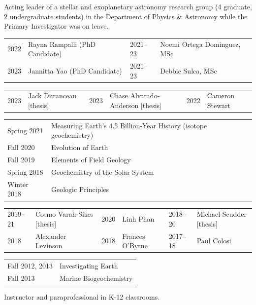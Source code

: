 Acting leader of a stellar and exoplanetary astronomy research group (4 graduate, 2 undergraduate students) in the Department of Physics \& Astronomy while the Primary Investigator was on leave.

\begin{tabular}{ll|ll}
	2022\ongoing & Rayna Rampalli (PhD Candidate) 
	&
	2021--23 & Noemi Ortega Dominguez, MSc
	\\
	2023\ongoing & Jannitta Yao (PhD Candidate)
	&
	2021--23 & Debbie Sulca, MSc
\end{tabular}
\begin{tabular}{ll | ll |ll}
	2023 & Jack Duranceau [thesis] & 
	2023 & Chase Alvarado-Anderson [thesis] &
	2022 & Cameron Stewart
\end{tabular}

\begin{tabular}{ll}
	Spring 2021 & Measuring Earth’s 4.5 Billion-Year History \normalfont(isotope geochemistry)\\
	Fall 2020 & Evolution of Earth\\
	Fall 2019 & Elements of Field Geology\\
	Spring 2018 & Geochemistry of the Solar System\\
	Winter 2018 & Geologic Principles
\end{tabular}

\begin{tabular}{ll | ll | ll}
	2019--21 & Cosmo Varah-Sikes [thesis] &
	2020 & Linh Phan &
	2018--20 & Michael Scudder [thesis] \\
	2018 & Alexander Levinson &
	2018 & Frances O'Byrne &
	2017--18 & Paul Colosi
\end{tabular}

\begin{tabular}{l l} %
Fall 2012, 2013 & Investigating Earth\\Fall 2013 & Marine Biogeochemistry
\end{tabular}

Instructor and paraprofessional in K-12 classrooms.